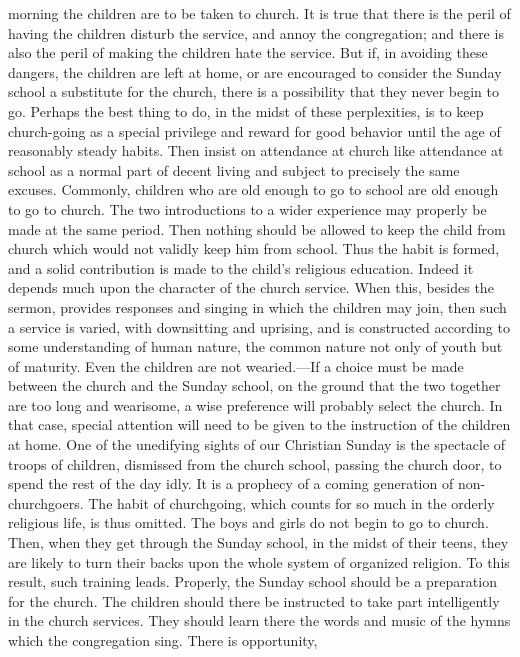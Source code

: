 morning the children are to be taken to church. It is true that there is the peril of having the children disturb the service, and annoy the congregation; and there is also the peril of making the children hate the service. But if, in avoiding these dangers, the children are left at home, or are encouraged to consider the Sunday school a substitute for the church, there is a possibility that they never begin to go. Perhaps the best thing to do, in the midst of these perplexities, is to keep church-going as a special privilege and reward for good behavior until the age of reasonably steady habits. Then insist on attendance at church like attendance at school as a normal part of decent living and subject to precisely the same excuses. Commonly, children who are old enough to go to school are old enough to go to church. The two introductions to a wider experience may properly be made at the same period. Then nothing should be allowed to keep the child from church which would not validly keep him from school. Thus the habit is formed, and a solid contribution is made to the child's religious education. Indeed it depends much upon the character of the church service. When this, besides the sermon, provides responses and singing in which the children may join, then such a service is varied, with downsitting and uprising, and is constructed according to some understanding of human nature, the common nature not only of youth but of maturity. Even the children are not wearied.—If a choice must be made between the church and the Sunday school, on the ground that the two together are too long and wearisome, a wise preference will probably select the church. In that case, special attention will need to be given to the instruction of the children at home. One of the unedifying sights of our Christian Sunday is the spectacle of troops of children, dismissed from the church school, passing the church door, to spend the rest of the day idly. It is a prophecy of a coming generation of non-churchgoers. The habit of churchgoing, which counts for so much in the orderly religious life, is thus omitted. The boys and girls do not begin to go to church. Then, when they get through the Sunday school, in the midst of their teens, they are likely to turn their backs upon the whole system of organized religion. To this result, such training leads. Properly, the Sunday school should be a preparation for the church. The children should there be instructed to take part intelligently in the church services. They should learn there the words and music of the hymns which the congregation sing. There is opportunity,
